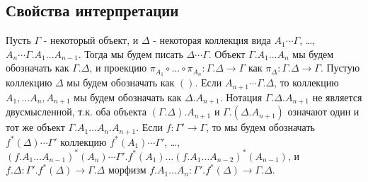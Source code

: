 \documentclass{amsart}
\theoremstyle{definition}
\theoremstyle{remark}
\numberwithin{figure}{section}
\begin{document}
\begin{comment}
Пусть $\Gamma.A \xrightarrow{t} P(\Gamma.A) \xrightarrow{\langle p_1, p_2 \rangle} \Gamma.A \times \Gamma.A$ - объект путей для $\Gamma.A$.

Во-первых, определим $h'_1 : \Gamma \to P(\Gamma.A)$ как композицию $p \circ i_1$, где $p$ определяется следующим образом:
\[ \xymatrix{ \Gamma \ar[r]^-a \ar[d]_{i_0} & \Gamma.A \ar[r]^-t & P(\Gamma.A) \ar[d]^{\langle p_1, p_2 \rangle} \\
              \Gamma \times I' \ar[rr]_-{\langle a \circ \pi_1, h_1 \rangle} \ar@{-->}[urr]^p & & \Gamma.A \times \Gamma.A
            }\]
Во-вторых, определим $h'_3 : \Gamma \to P(\Gamma.A)$ как композицию $q \circ i_1$, где $q$ определяется следующим образом:
\[ \xymatrix{ \Gamma \ar[rr]^{h'_1} \ar[d]_{i_0}                  & & P(\Gamma.A) \ar[d]^{\langle p_1, p_2 \rangle} \\
              \Gamma \times I' \ar[rr]_-{\langle a \circ \pi_1, h_2 \rangle} \ar@{-->}[urr]^q & & \Gamma.A \times \Gamma.A
            }\]
Теперь определим $h_3 : \Gamma \times I' \to \Gamma.A$ как композицию $p_2 \circ s$, где $s$ определяется следующим образом:
\[ \xymatrix{ \Gamma \amalg \Gamma \ar[rr]^{[t \circ a, h'_3]} \ar[d] & & P(\Gamma.A) \ar[d]^{p_1} \\
              \Gamma \times I' \ar[r]_-{\pi_1} \ar@{-->}[urr]^s & \Gamma \ar[r]_-a & \Gamma.A
            }\]
\end{comment}

\subsection{Свойства интерпретации}

Пусть $\Gamma$ - некоторый объект, и $\Delta$ - некоторая коллекция вида $A_1 \dotsb \Gamma$, \ldots, $A_n \dotsb \Gamma.A_1 \ldots A_{n-1}$.
Тогда мы будем писать $\Delta \dotsb \Gamma$.
Объект $\Gamma.A_1 \ldots A_n$ мы будем обозначать как $\Gamma.\Delta$,
    и проекцию $\pi_{A_1} \circ \ldots \circ \pi_{A_n} : \Gamma.\Delta \to \Gamma$ как $\pi_\Delta : \Gamma.\Delta \to \Gamma$.
Пустую коллекцию $\Delta$ мы будем обозначать как $()$.
Если $A_{n+1} \dotsb \Gamma.\Delta$, то коллекцию $A_1, \ldots A_n, A_{n+1}$ мы будем обозначать как $\Delta.A_{n+1}$.
Нотация $\Gamma.\Delta.A_{n+1}$ не является двусмысленной, т.к. оба объекта $(\Gamma.\Delta).A_{n+1}$ и $\Gamma.(\Delta.A_{n+1})$ означают один и тот же объект $\Gamma.A_1 \ldots A_n.A_{n+1}$.
Если $f : \Gamma' \to \Gamma$, то мы будем обозначать $f^*(\Delta) \dotsb \Gamma'$ коллекцию $f^*(A_1) \dotsb \Gamma'$, \ldots, $(f.A_1 \ldots A_{n-1})^*(A_n) \dotsb \Gamma'.f^*(A_1) \ldots (f.A_1 \ldots A_{n-2})^*(A_{n-1})$,
    и $f.\Delta : \Gamma'.f^*(\Delta) \to \Gamma.\Delta$ морфизм $f.A_1 \ldots A_n : \Gamma'.f^*(\Delta) \to \Gamma.\Delta$.
\end{document}

